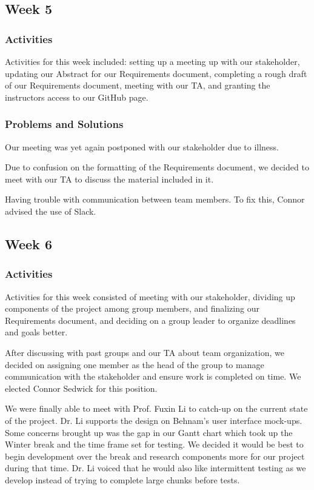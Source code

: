 \documentclass[journal,10pt,onecolumn,compsoc]{IEEEtran} \usepackage[margin=1.0in]{geometry} \usepackage{pdfpages}
\begin{document}
\subsection{Week 5}
\subsubsection{Activities}
Activities for this week included: setting up a meeting up with our stakeholder, updating our Abstract for our Requirements document, completing a rough draft of our Requirements document, meeting with our TA, and granting the instructors access to our GitHub page.

\subsubsection{Problems and Solutions}
Our meeting was yet again postponed with our stakeholder due to illness. 

\noindent Due to confusion on the formatting of the Requirements document, we decided to meet with our TA to discuss the material included in it. 

\noindent Having trouble with communication between team members. To fix this, Connor advised the use of Slack.
\subsection{Week 6}
\subsubsection{Activities}
Activities for this week consisted of meeting with our stakeholder, dividing up components of the project among group members, and finalizing our Requirements document, and deciding on a group leader to organize deadlines and goals better.

\noindent After discussing with past groups and our TA about team organization, we decided on assigning one member as the head of the group to manage communication with the stakeholder and ensure work is completed on time. 
We elected Connor Sedwick for this position.

\noindent We were finally able to meet with Prof. Fuxin Li to catch-up on the current state of the project. 
Dr. Li supports the design on Behnam's user interface mock-ups.
Some concerns brought up was the gap in our Gantt chart which took up the Winter break and the time frame set for testing.
We decided it would be best to begin development over the break and research components more for our project during that time. 
Dr. Li voiced that he would also like intermittent testing as we develop instead of trying to complete large chunks before tests.
\end{document}
